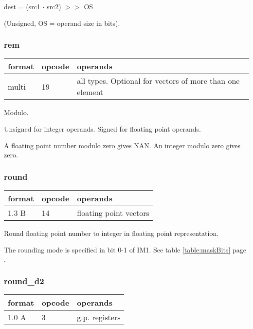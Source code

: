 \documentclass[forwardcom.tex]{subfiles}
\begin{document}
dest = (src1 $\cdot$ src2) $>>$ OS

(Unsigned, OS = operand size in bits).


\subsubsection{rem}
\label{table:remInstruction}
\begin{tabular}{|p{12mm}|p{12mm}|p{110mm}|}
\hline
\bfseries format & \bfseries opcode & \bfseries operands \\ \hline
multi & 19 & all types. Optional for vectors of more than one element \\ \hline
\end{tabular}
\vspace{2mm}

Modulo. 

\vspace{2mm}
Unsigned for integer operands.
Signed for floating point operands.

\vspace{2mm}
A floating point number modulo zero gives NAN.
An integer modulo zero gives zero.

\subsubsection{round}
\label{table:roundInstruction}
\begin{tabular}{|p{12mm}|p{12mm}|p{110mm}|}
\hline
\bfseries format & \bfseries opcode & \bfseries operands \\ \hline
1.3 B & 14 & floating point vectors \\ \hline
\end{tabular}
\vspace{2mm}

Round floating point number to integer in floating point representation.
\vspace{2mm}

The rounding mode is specified in bit 0-1 of IM1. See table \ref{table:maskBits} page \pageref{table:maskBits}.

\subsubsection{round\_d2}
\label{table:roundD2Instruction}
\begin{tabular}{|p{12mm}|p{12mm}|p{110mm}|}
\hline
\bfseries format & \bfseries opcode & \bfseries operands \\ \hline
1.0 A &  3 & g.p. registers \\ \hline
\end{tabular}
\vspace{2mm}
\end{document}
